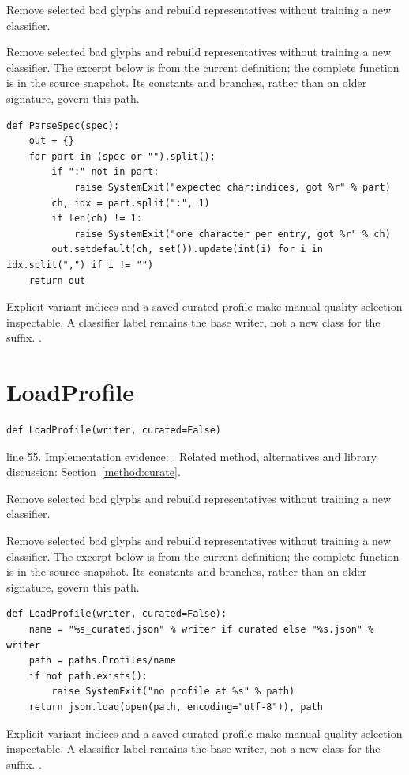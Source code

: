 Remove selected bad glyphs and rebuild representatives without training a new classifier.


Remove selected bad glyphs and rebuild representatives without training a new classifier. The excerpt below is from the current definition; the complete function is in the source snapshot. Its constants and branches, rather than an older signature, govern this path.


\begin{lstlisting}[style=plain]
def ParseSpec(spec):
    out = {}
    for part in (spec or "").split():
        if ":" not in part:
            raise SystemExit("expected char:indices, got %r" % part)
        ch, idx = part.split(":", 1)
        if len(ch) != 1:
            raise SystemExit("one character per entry, got %r" % ch)
        out.setdefault(ch, set()).update(int(i) for i in idx.split(",") if i != "")
    return out
\end{lstlisting}
Explicit variant indices and a saved curated profile make manual quality selection inspectable. A classifier label remains the base writer, not a new class for the suffix. \cite{code2026,haines2016,pillowdraw}.


\section{LoadProfile}\label{fn:curate:LoadProfile}
\begin{lstlisting}[style=sig]
def LoadProfile(writer, curated=False)
\end{lstlisting}
 line 55. Implementation evidence: \cite{code2026}. Related method, alternatives and library discussion: Section~\ref{method:curate}.


Remove selected bad glyphs and rebuild representatives without training a new classifier.


Remove selected bad glyphs and rebuild representatives without training a new classifier. The excerpt below is from the current definition; the complete function is in the source snapshot. Its constants and branches, rather than an older signature, govern this path.


\begin{lstlisting}[style=plain]
def LoadProfile(writer, curated=False):
    name = "%s_curated.json" % writer if curated else "%s.json" % writer
    path = paths.Profiles/name
    if not path.exists():
        raise SystemExit("no profile at %s" % path)
    return json.load(open(path, encoding="utf-8")), path
\end{lstlisting}
Explicit variant indices and a saved curated profile make manual quality selection inspectable. A classifier label remains the base writer, not a new class for the suffix. \cite{code2026,haines2016,pillowdraw}.


